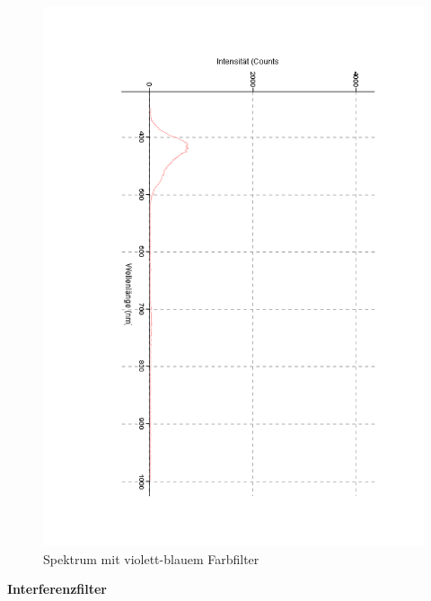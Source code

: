 \documentclass[12pt,a4paper]{article}
\begin{document}
\begin{figure}[H]
	\centering
	\includegraphics[scale=0.5,angle = 90,trim = 20mm 20mm 20mm 20mm]{./data/Spektro/Farbfilter_Absorbtion_Violett_Blau_DO4.pdf}
	\caption{Spektrum mit violett-blauem Farbfilter}
	\label{fig:FilterBlau}
\end{figure}

\textbf{Interferenzfilter}
\end{document}

